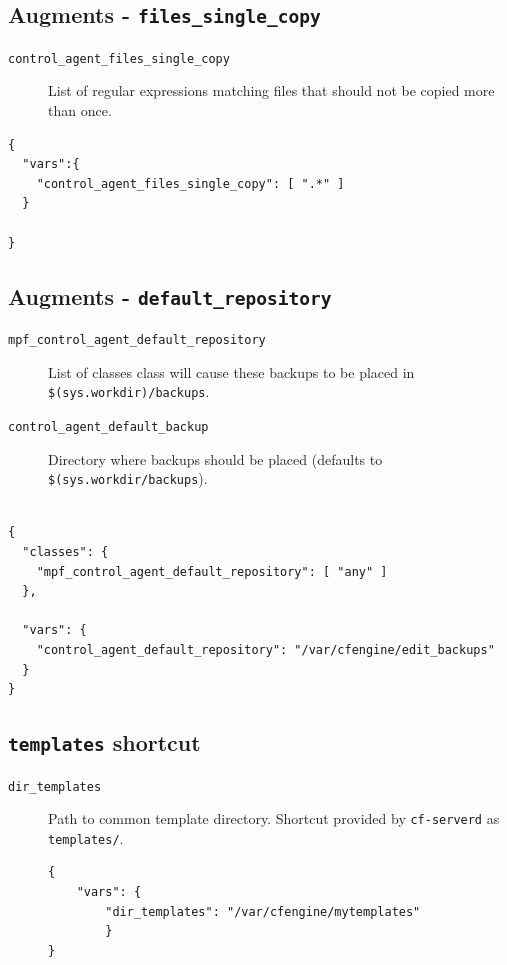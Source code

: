 \documentclass[11pt]{article}
\begin{document}
\subsection*{Augments - \texttt{files\_single\_copy}}
\label{sec:org3910fbd}

\begin{description}
\item[{\texttt{control\_agent\_files\_single\_copy}}] List of regular expressions matching
files that should not be copied more than once.
\end{description}

\begin{verbatim}
{
  "vars":{
    "control_agent_files_single_copy": [ ".*" ]
  }

}
\end{verbatim}

\subsection*{Augments - \texttt{default\_repository}}
\label{sec:org1209b12}

\begin{description}
\item[{\texttt{mpf\_control\_agent\_default\_repository}}] List of classes class will cause
these backups to be placed in \texttt{\$(sys.workdir)/backups}.

\item[{\texttt{control\_agent\_default\_backup}}] Directory where backups should be placed
(defaults to \texttt{\$(sys.workdir/backups}).
\end{description}

\begin{verbatim}

{
  "classes": {
    "mpf_control_agent_default_repository": [ "any" ]
  },

  "vars": {
    "control_agent_default_repository": "/var/cfengine/edit_backups"
  }
}
\end{verbatim}

\subsection*{\texttt{templates} shortcut}
\label{sec:org90caa4c}

\begin{description}
\item[{\texttt{dir\_templates}}] Path to common template directory. Shortcut provided by
\texttt{cf-serverd} as \texttt{templates/}.

\begin{verbatim}
{
    "vars": {
        "dir_templates": "/var/cfengine/mytemplates"
        }
}
\end{verbatim}
\end{description}
\end{document}
